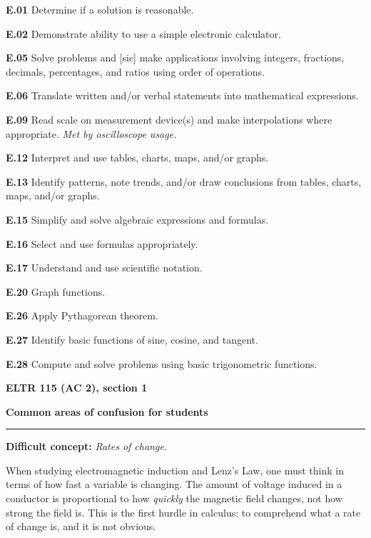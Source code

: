\item{\bf E.01} Determine if a solution is reasonable.
\item{\bf E.02} Demonstrate ability to use a simple electronic calculator.
\item{\bf E.05} Solve problems and [sic] make applications involving integers, fractions, decimals, percentages, and ratios using order of operations.
\item{\bf E.06} Translate written and/or verbal statements into mathematical expressions.
\item{\bf E.09} Read scale on measurement device(s) and make interpolations where appropriate.  {\it Met by oscilloscope usage.}
\item{\bf E.12} Interpret and use tables, charts, maps, and/or graphs.
\item{\bf E.13} Identify patterns, note trends, and/or draw conclusions from tables, charts, maps, and/or graphs.
\item{\bf E.15} Simplify and solve algebraic expressions and formulas.
\item{\bf E.16} Select and use formulas appropriately.
\item{\bf E.17} Understand and use scientific notation.
\item{\bf E.20} Graph functions.
\item{\bf E.26} Apply Pythagorean theorem.
\item{\bf E.27} Identify basic functions of sine, cosine, and tangent.
\item{\bf E.28} Compute and solve problems using basic trigonometric functions.
\medskip







\vfil \eject

\centerline{\bf ELTR 115 (AC 2), section 1} \bigskip 
 
\vskip 10pt

\noindent
{\bf Common areas of confusion for students}

\vskip 5pt

\hrule \vskip 5pt

\vskip 10pt

\noindent
{\bf Difficult concept: } {\it Rates of change.}

When studying electromagnetic induction and Lenz's Law, one must think in terms of how fast a variable is changing.  The amount of voltage induced in a conductor is proportional to how {\it quickly} the magnetic field changes, not how strong the field is.  This is the first hurdle in calculus: to comprehend what a rate of change is, and it is not obvious.

